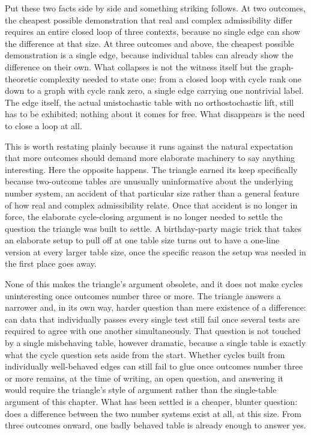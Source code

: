 \documentclass[12pt,openany]{book}
\begin{document}
Put these two facts side by side and something striking follows. At two outcomes, the cheapest possible demonstration that real and complex admissibility differ requires an entire closed loop of three contexts, because no single edge can show the difference at that size. At three outcomes and above, the cheapest possible demonstration is a single edge, because individual tables can already show the difference on their own. What collapses is not the witness itself but the graph-theoretic complexity needed to state one: from a closed loop with cycle rank one down to a graph with cycle rank zero, a single edge carrying one nontrivial label. The edge itself, the actual unistochastic table with no orthostochastic lift, still has to be exhibited; nothing about it comes for free. What disappears is the need to close a loop at all.

This is worth restating plainly because it runs against the natural expectation that more outcomes should demand more elaborate machinery to say anything interesting. Here the opposite happens. The triangle earned its keep specifically because two-outcome tables are unusually uninformative about the underlying number system, an accident of that particular size rather than a general feature of how real and complex admissibility relate. Once that accident is no longer in force, the elaborate cycle-closing argument is no longer needed to settle the question the triangle was built to settle. A birthday-party magic trick that takes an elaborate setup to pull off at one table size turns out to have a one-line version at every larger table size, once the specific reason the setup was needed in the first place goes away.

None of this makes the triangle's argument obsolete, and it does not make cycles uninteresting once outcomes number three or more. The triangle answers a narrower and, in its own way, harder question than mere existence of a difference: can data that individually passes every single test still fail once several tests are required to agree with one another simultaneously. That question is not touched by a single misbehaving table, however dramatic, because a single table is exactly what the cycle question sets aside from the start. Whether cycles built from individually well-behaved edges can still fail to glue once outcomes number three or more remains, at the time of writing, an open question, and answering it would require the triangle's style of argument rather than the single-table argument of this chapter. What has been settled is a cheaper, blunter question: does a difference between the two number systems exist at all, at this size. From three outcomes onward, one badly behaved table is already enough to answer yes.
\end{document}
